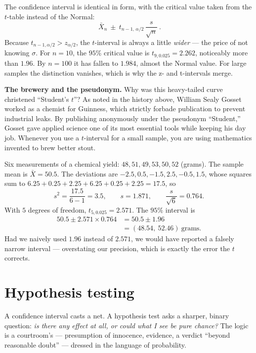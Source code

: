 The confidence interval is identical in form, with the critical value taken from the
$t$-table instead of the Normal:
\[
  \boxed{\ \bar X_n \ \pm\ t_{n-1,\,\alpha/2}\,\frac{s}{\sqrt n}\ } .
\]
Because $t_{n-1,\alpha/2} > z_{\alpha/2}$, the $t$-interval is always a little
\emph{wider} --- the price of not knowing $\sigma$. For $n = 10$, the $95\%$
critical value is $t_{9,0.025} = 2.262$, noticeably more than $1.96$. By $n = 100$ it
has fallen to $1.984$, almost the Normal value. For large samples the distinction
vanishes, which is why the z- and t-intervals merge.

\begin{connectionbox}
\textbf{The brewery and the pseudonym.} Why was this heavy-tailed curve christened
``Student's $t$''? As noted in the history above, William Sealy Gosset worked as a chemist
for Guinness, which strictly forbade publication to prevent industrial leaks. By
publishing anonymously under the pseudonym ``Student,'' Gosset gave applied science one of
its most essential tools while keeping his day job. Whenever you use a $t$-interval for a
small sample, you are using mathematics invented to brew better stout.
\end{connectionbox}

\begin{example}
\label{ch32:ex-tinterval}
Six measurements of a chemical yield: $48, 51, 49, 53, 50, 52$ (grams). The sample mean
is $\bar X = 50.5$. The deviations are $-2.5, 0.5, -1.5, 2.5, -0.5, 1.5$, whose squares
sum to $6.25+0.25+2.25+6.25+0.25+2.25 = 17.5$, so
\[
  s^2 = \frac{17.5}{6-1} = 3.5,\qquad s = 1.871,\qquad \frac{s}{\sqrt 6} = 0.764.
\]
With $5$ degrees of freedom, $t_{5,0.025} = 2.571$. The $95\%$ interval is
\begin{align*}
  50.5 \pm 2.571 \times 0.764 &= 50.5 \pm 1.96 \\
                              &= (48.54,\ 52.46)\ \text{grams}.
\end{align*}
Had we naively used $1.96$ instead of $2.571$, we would have reported a falsely narrow
interval --- overstating our precision, which is exactly the error the $t$ corrects.
\end{example}

\section{Hypothesis testing}
\label{ch32:testing}

A confidence interval casts a net. A hypothesis test asks a sharper, binary question:
\emph{is there any effect at all, or could what I see be pure chance?} The logic is a
courtroom's --- presumption of innocence, evidence, a verdict ``beyond reasonable
doubt'' --- dressed in the language of probability.

